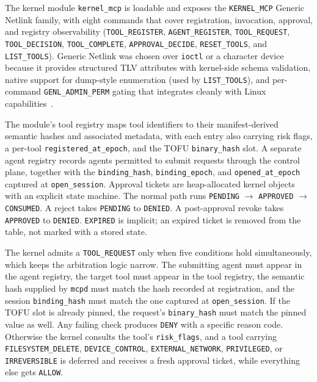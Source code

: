 The kernel module \texttt{kernel\_\allowbreak mcp} is loadable and exposes the \texttt{KERNEL\_\allowbreak MCP} Generic Netlink family, with eight commands that cover registration, invocation, approval, and registry observability (\texttt{TOOL\_\allowbreak REGISTER}, \texttt{AGENT\_\allowbreak REGISTER}, \texttt{TOOL\_\allowbreak REQUEST}, \texttt{TOOL\_\allowbreak DECISION}, \texttt{TOOL\_\allowbreak COMPLETE}, \texttt{APPROVAL\_\allowbreak DECIDE}, \texttt{RESET\_\allowbreak TOOLS}, and \texttt{LIST\_\allowbreak TOOLS}).
Generic Netlink was chosen over \texttt{ioctl} or a character device because it provides structured TLV attributes with kernel-side schema validation, native support for dump-style enumeration (used by \texttt{LIST\_\allowbreak TOOLS}), and per-command \texttt{GENL\_\allowbreak ADMIN\_\allowbreak PERM} gating that integrates cleanly with Linux capabilities~\cite{netlink2026}.

The module's tool registry maps tool identifiers to their manifest-derived semantic hashes and associated metadata, with each entry also carrying risk flags, a per-tool \texttt{registered\_\allowbreak at\_\allowbreak epoch}, and the TOFU \texttt{binary\_\allowbreak hash} slot. A separate agent registry records agents permitted to submit requests through the control plane, together with the \texttt{binding\_\allowbreak hash}, \texttt{binding\_\allowbreak epoch}, and \texttt{opened\_\allowbreak at\_\allowbreak epoch} captured at \texttt{open\_\allowbreak session}.
Approval tickets are heap-allocated kernel objects with an explicit state machine.
The normal path runs \texttt{PENDING} $\to$ \texttt{APPROVED} $\to$ \texttt{CONSUMED}.
A reject takes \texttt{PENDING} to \texttt{DENIED}.
A post-approval revoke takes \texttt{APPROVED} to \texttt{DENIED}.
\texttt{EXPIRED} is implicit; an expired ticket is removed from the table, not marked with a stored state.

The kernel admits a \texttt{TOOL\_\allowbreak REQUEST} only when five conditions hold simultaneously, which keeps the arbitration logic narrow.
The submitting agent must appear in the agent registry, the target tool must appear in the tool registry, the semantic hash supplied by \texttt{mcpd} must match the hash recorded at registration, and the session \texttt{binding\_\allowbreak hash} must match the one captured at \texttt{open\_\allowbreak session}. If the TOFU slot is already pinned, the request's \texttt{binary\_\allowbreak hash} must match the pinned value as well.
Any failing check produces \texttt{DENY} with a specific reason code. Otherwise the kernel consults the tool's \texttt{risk\_\allowbreak flags}, and a tool carrying \texttt{FILESYSTEM\_\allowbreak DELETE}, \texttt{DEVICE\_\allowbreak CONTROL}, \texttt{EXTERNAL\_\allowbreak NETWORK}, \texttt{PRIVILEGED}, or \texttt{IRREVERSIBLE} is deferred and receives a fresh approval ticket, while everything else gets \texttt{ALLOW}.

